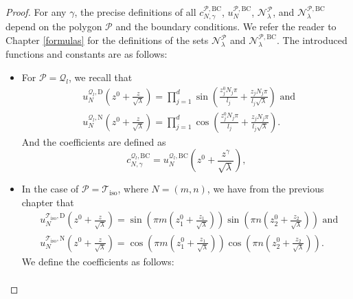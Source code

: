 \documentclass{amsart}
\theoremstyle{definition}
\theoremstyle{remark}
\numberwithin{equation}{section}
\theoremstyle{definition}
\theoremstyle{remark}
\begin{document}
\begin{proof}
	For any $\gamma$, the precise definitions of all $	c_{N,\gamma}^{\mathcal{P},\mathrm{BC}}$, $u_N^{\mathcal{P},\mathrm{BC}}$, $\mathcal{N}_\lambda^{\mathcal{P}}$, and $\mathcal{N}_\lambda^{\mathcal{P},\mathrm{BC}}$ depend on the polygon $\mathcal{P}$ and the boundary conditions. We refer the reader to Chapter \ref{formulas} for the definitions of the sets $\mathcal{N}_\lambda^{\mathcal{P}}$ and $\mathcal{N}_\lambda^{\mathcal{P},\mathrm{BC}}$. The introduced functions and constants are as follows:
	\begin{itemize}
		\item For $\mathcal{P}=\mathcal{Q}_l$, we recall that
		\begin{equation}
			\begin{aligned}
				&u_{N}^{\mathcal{Q}_l,\mathrm{D}}\left(z^0+\frac{z}{\sqrt{\lambda}}\right)=\prod_{j=1}^{d}\sin\left(\frac{z^0_jN_j\pi}{l_j}+\frac{z_jN_j\pi}{l_j\sqrt{\lambda}}\right)\text{ and }\\	&u_{N}^{\mathcal{Q}_l,\mathrm{N}}\left(z^0+\frac{z}{\sqrt{\lambda}}\right)=\prod_{j=1}^{d}\cos\left(\frac{z^0_jN_j\pi}{l_j}+\frac{z_jN_j\pi}{l_j\sqrt{\lambda}}\right).
			\end{aligned}
		\end{equation}
		And the coefficients are defined as 
		\begin{equation}
			c_{N,\gamma}^{\mathcal{Q}_l,\mathrm{BC}}=u_N^{\mathcal{Q}_l,\mathrm{BC}}\left(z^0+\frac{z^\gamma}{\sqrt{\lambda}}\right),
		\end{equation}
		\item	In the case of $\mathcal{P}=\mathcal{T}_\mathrm{iso}$, where $N=(m,n)$, we have from the previous chapter that
		\begin{equation}
			\begin{aligned}
				&u_{N}^{\mathcal{T}_\mathrm{iso},\mathrm{D}}\left(z^0+\frac{z}{\sqrt{\lambda}}\right)=\sin\left(\pi m\left(z^0_1+\frac{z_1}{\sqrt{\lambda}}\right)\right)\sin\left(\pi n\left(z^0_2+\frac{z_2}{\sqrt{\lambda}}\right)\right)\text{ and }\\	&u_{N}^{\mathcal{T}_\mathrm{iso},\mathrm{N}}\left(z^0+\frac{z}{\sqrt{\lambda}}\right)=\cos\left(\pi m\left(z^0_1+\frac{z_1}{\sqrt{\lambda}}\right)\right)\cos\left(\pi n\left(z_2^0+\frac{z_2}{\sqrt{\lambda}}\right)\right).
			\end{aligned}
		\end{equation}
		We define the coefficients as follows:
		\begin{equation}
			\begin{aligned}

\end{aligned}
\end{equation}
\end{itemize}
\end{proof}
\end{document}
